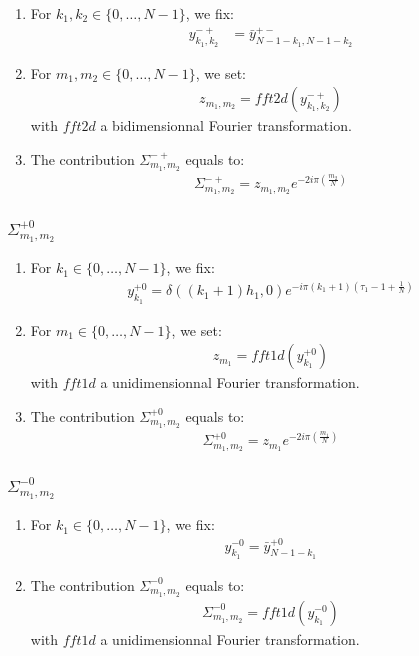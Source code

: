 \begin{enumerate}
\item For $k_1,k_2\in\{0,\hdots,N-1\}$, we fix:
\begin{align*}
y^{-+}_{k_1,k_2}&=\bar{y}^{+-}_{N-1-k_1,N-1-k_2}
\end{align*}
\item For $m_1,m_2\in\{0,\hdots,N-1\}$, we set:
\begin{align*}
  z_{m_1,m_2}=fft2d(y^{-+}_{k_1,k_2})
\end{align*}
with $fft2d$ a bidimensionnal Fourier transformation.
\item The contribution $\Sigma_{m_1,m_2}^{-+}$ equals to:
\begin{align*}
  \Sigma_{m_1,m_2}^{-+}=z_{m_1,m_2} e^{-2i\pi\left(\frac{m_2}{N}\right)}
\end{align*}
\end{enumerate}


\subsubsection{$\Sigma_{m_1,m_2}^{+0}$}
\begin{enumerate}
\item For $k_1\in\{0,\hdots,N-1\}$, we fix:
\begin{align*}
y^{+0}_{k_1}= \delta((k_1+1)h_1,0)e^{-i\pi (k_1+1)\left(\tau_1-1+\frac{1}{N}\right)}
\end{align*}
\item For $m_1\in\{0,\hdots,N-1\}$, we set:
\begin{align*}
  z_{m_1}=fft1d(y^{+0}_{k_1})
\end{align*}
with $fft1d$ a unidimensionnal Fourier transformation.
\item The contribution $\Sigma_{m_1,m_2}^{+0}$ equals to:
\begin{align*}
  \Sigma_{m_1,m_2}^{+0}=z_{m_1} e^{-2i\pi\left(\frac{m_1}{N}\right)}
\end{align*}
\end{enumerate}

\subsubsection{$\Sigma_{m_1,m_2}^{-0}$}
\begin{enumerate}
\item For $k_1\in\{0,\hdots,N-1\}$, we fix:
\begin{align*}
y^{-0}_{k_1}= \bar{y}^{+0}_{N-1-k_1}
\end{align*}
\item The contribution $\Sigma_{m_1,m_2}^{-0}$ equals to:
\begin{align*}
  \Sigma_{m_1,m_2}^{-0}=fft1d(y^{-0}_{k_1})
\end{align*}
with $fft1d$ a unidimensionnal Fourier transformation.
\end{enumerate}

